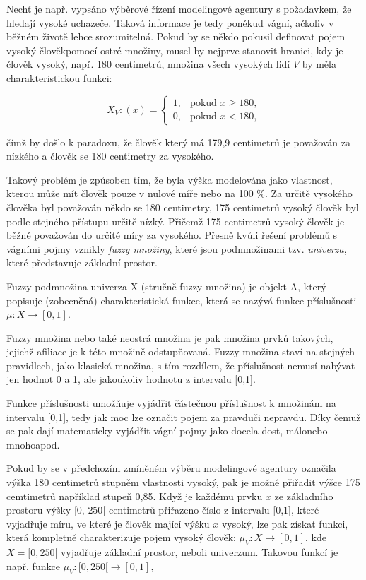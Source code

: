 Nech\v t je např. vypsáno výběrové řízení modelingové agentury s požadavkem, že hledají vysoké uchazeče. Taková informace je tedy poněkud vágní, ačkoliv v běžném životě lehce srozumitelná. Pokud by se někdo pokusil definovat pojem \clqq vysoký člověk\crqq \space pomocí ostré množiny, musel by nejprve stanovit hranici, kdy je člověk vysoký, např. 180 centimetr\r u, množina všech vysokých lidí $V$ by měla charakteristickou funkci:

    $$X_V:(x)=\begin{cases} 1, & \mbox{pokud }  x \geq 180,\\    0, & \mbox{pokud } x < 180,  \end{cases}$$

    čímž by došlo k paradoxu, že člověk který má 179,9 centimetr\r u je považován za nízkého a člověk se 180 centimetry za vysokého.

    Takový problém je zp\r usoben tím, že byla výška modelována jako vlastnost, kterou m\r uže mít člověk pouze v nulové míře nebo na 100 \%. Za určitě vysokého člověka byl považován někdo se 180 centimetry, 175 centimetr\r u vysoký člověk byl podle stejného přístupu určitě n\'izk\'y. Přičemž 175 centimetr\r u vysoký člověk je běžně považován do určité míry za vysokého. Přesně kvůli řešení problémů s vágními pojmy vznikly \textit{fuzzy množiny}, které jsou podmno\v zinami tzv. \textit{univerza}, které p\v redstavuje základní prostor. 
    
    \begin{definition}
    \cite{navara}
        Fuzzy podmnožina univerza X (stručně fuzzy množina) je objekt A, který popisuje (zobecněná) charakteristická funkce, která se nazývá funkce příslušnosti $\mu: X \rightarrow [0,1]$. 
    \end{definition}
    
    Fuzzy množina nebo také neostrá množina je pak množina prvků takových, jejichž afiliace je k této množině odstupňovaná. Fuzzy množina staví na stejných pravidlech, jako klasická množina, s tím rozdílem, že příslušnost nemusí nabývat jen hodnot 0 a 1, ale jakoukoliv hodnotu z intervalu [0,1]. 
   
    Funkce příslušnosti umož\v nuje vyjádřit částečnou příslušnost k množinám na intervalu [0,1], tedy jak moc lze označit pojem za \clqq pravdu\crqq \space či \clqq nepravdu\crqq. Díky čemuž se pak dají matematicky vyjádřit vágní pojmy jako \clqq docela dost\crqq, \clqq málo\crqq \space nebo \clqq mnoho\crqq \space apod.

     Pokud by se v předchozím zmíněném výběru modelingové agentury označila výška 180 centimetr\r u stupněm vlastnosti \clqq vysoký\crqq {}, pak je možné přiřadit výšce 175 cemtimetr\r u například stupe\v n 0,85. Když je každému prvku $x$ ze základního prostoru výšky [0, $250$[ centimetr\r u přiřazeno číslo z intervalu [0,1], které vyjadřuje míru, ve které je člověk mající výšku $x$ vysoký, lze pak získat funkci, která kompletně charakterizuje pojem vysoký člověk: $\mu_V: X \to [0,1]$, kde $X = [0, 250[$ vyjadřuje základní prostor, neboli univerzum. Takovou funkcí je např. funkce $\mu_V:  [0, 250[ \rightarrow [0,1]$, 

